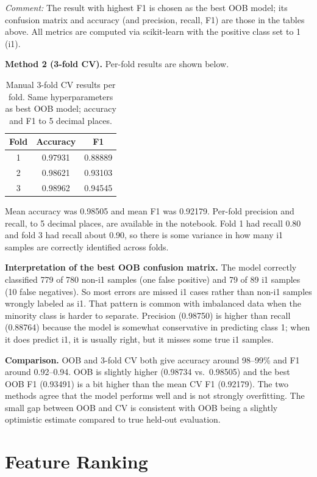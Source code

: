 \documentclass[11pt]{article}
\begin{document}
\textit{Comment:} The result with highest F1 is chosen as the best OOB model; its confusion matrix and accuracy (and precision, recall, F1) are those in the tables above. All metrics are computed via scikit-learn with the positive class set to 1 (i1).

\textbf{Method 2 (3-fold CV).} Per-fold results are shown below.

\begin{table}[H]
\centering
\caption{Manual 3-fold CV results per fold. Same hyperparameters as best OOB model; accuracy and F1 to 5 decimal places.}
\begin{tabular}{ccc}
\toprule
\textbf{Fold} & \textbf{Accuracy} & \textbf{F1} \\
\midrule
1 & 0.97931 & 0.88889 \\
2 & 0.98621 & 0.93103 \\
3 & 0.98962 & 0.94545 \\
\bottomrule
\end{tabular}
\end{table}

Mean accuracy was 0.98505 and mean F1 was 0.92179. Per-fold precision and recall, to 5 decimal places, are available in the notebook. Fold 1 had recall 0.80 and fold 3 had recall about 0.90, so there is some variance in how many i1 samples are correctly identified across folds.

\textbf{Interpretation of the best OOB confusion matrix.} The model correctly classified 779 of 780 non-i1 samples (one false positive) and 79 of 89 i1 samples (10 false negatives). So most errors are missed i1 cases rather than non-i1 samples wrongly labeled as i1. That pattern is common with imbalanced data when the minority class is harder to separate. Precision (0.98750) is higher than recall (0.88764) because the model is somewhat conservative in predicting class 1; when it does predict i1, it is usually right, but it misses some true i1 samples.

\textbf{Comparison.} OOB and 3-fold CV both give accuracy around 98--99\% and F1 around 0.92--0.94. OOB is slightly higher (0.98734 vs.\ 0.98505) and the best OOB F1 (0.93491) is a bit higher than the mean CV F1 (0.92179). The two methods agree that the model performs well and is not strongly overfitting. The small gap between OOB and CV is consistent with OOB being a slightly optimistic estimate compared to true held-out evaluation.

\section{Feature Ranking}
\end{document}
